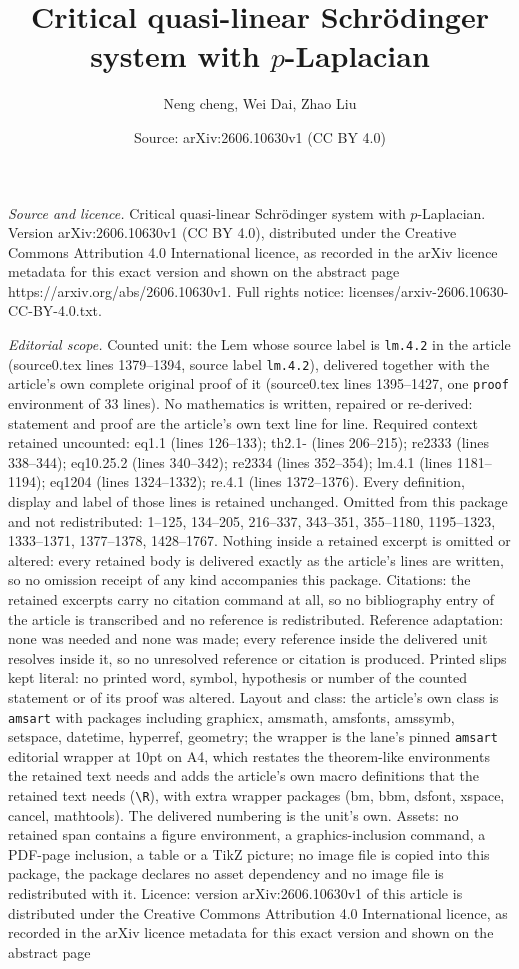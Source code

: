\documentclass[10pt,a4paper]{amsart}
\title[Critical quasi-linear Schr\"{o}dinger system with $p$-Laplac]{Critical quasi-linear Schr\"{o}dinger system with $p$-Laplacian}
\author{Neng cheng, Wei Dai, Zhao Liu}
\date{Source: arXiv:2606.10630v1 (CC BY 4.0)}
\begin{document}
\maketitle

\noindent\emph{Source and licence.} Critical quasi-linear Schr\"{o}dinger system with $p$-Laplacian. Version arXiv:2606.10630v1 (CC BY 4.0), distributed under the Creative Commons Attribution 4.0 International licence, as recorded in the arXiv licence metadata for this exact version and shown on the abstract page https://arxiv.org/abs/2606.10630v1. Full rights notice: licenses/arxiv-2606.10630-CC-BY-4.0.txt.\par\smallskip

\noindent\textit{Editorial scope.} Counted unit: the Lem whose source label is \texttt{lm.4.2} in the article (source0.tex lines 1379--1394, source label \texttt{lm.4.2}), delivered together with the article's own complete original proof of it (source0.tex lines 1395--1427, one \texttt{proof} environment of 33 lines). No mathematics is written, repaired or re-derived: statement and proof are the article's own text line for line. Required context retained uncounted: eq1.1 (lines 126--133); th2.1- (lines 206--215); re2333 (lines 338--344); eq10.25.2 (lines 340--342); re2334 (lines 352--354); lm.4.1 (lines 1181--1194); eq1204 (lines 1324--1332); re.4.1 (lines 1372--1376). Every definition, display and label of those lines is retained unchanged. Omitted from this package and not redistributed: 1--125, 134--205, 216--337, 343--351, 355--1180, 1195--1323, 1333--1371, 1377--1378, 1428--1767. Nothing inside a retained excerpt is omitted or altered: every retained body is delivered exactly as the article's lines are written, so no omission receipt of any kind accompanies this package. Citations: the retained excerpts carry no citation command at all, so no bibliography entry of the article is transcribed and no reference is redistributed. Reference adaptation: none was needed and none was made; every reference inside the delivered unit resolves inside it, so no unresolved reference or citation is produced. Printed slips kept literal: no printed word, symbol, hypothesis or number of the counted statement or of its proof was altered. Layout and class: the article's own class is \texttt{amsart} with packages including graphicx, amsmath, amsfonts, amssymb, setspace, datetime, hyperref, geometry; the wrapper is the lane's pinned \texttt{amsart} editorial wrapper at 10pt on A4, which restates the theorem-like environments the retained text needs and adds the article's own macro definitions that the retained text needs (\texttt{\textbackslash R}), with extra wrapper packages (bm, bbm, dsfont, xspace, cancel, mathtools). The delivered numbering is the unit's own. Assets: no retained span contains a figure environment, a graphics-inclusion command, a PDF-page inclusion, a table or a TikZ picture; no image file is copied into this package, the package declares no asset dependency and no image file is redistributed with it. Licence: version arXiv:2606.10630v1 of this article is distributed under the Creative Commons Attribution 4.0 International licence, as recorded in the arXiv licence metadata for this exact version and shown on the abstract page 
\end{document}
